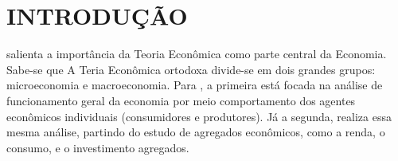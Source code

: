 \documentclass[twoside,a4paper,11pt]{report}
\begin{document}








\tableofcontents

\cleardoublepage

\pagestyle{fancy}


\chapter{INTRODUÇÃO}\label{intro}

\citet{bresser1968macroeconomia} salienta a importância da Teoria Econômica como parte central da Economia. Sabe-se que A Teria Econômica ortodoxa divide-se em dois grandes grupos: microeconomia e macroeconomia. Para \citet{bresser1968macroeconomia}, a primeira está focada na análise de funcionamento geral da economia por meio comportamento dos agentes econômicos individuais (consumidores e produtores). Já a segunda, realiza essa mesma análise, partindo do estudo de agregados econômicos, como a renda, o consumo, e o investimento agregados. 
\end{document}
